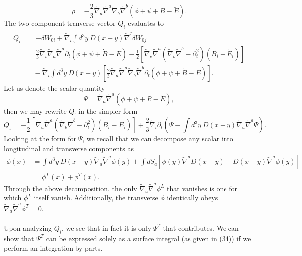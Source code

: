 \documentclass[10pt,letterpaper]{article}
\begin{document}
\begin{equation}
\rho =  -\frac{2}{3} \tilde{\nabla}_a\tilde{\nabla}^a\tilde{\nabla}_b\tilde{\nabla}^b (\phi + \psi +\dot{B}-\ddot{E}).
\end{equation}
The two component tranverse vector $Q_i$ evaluates to
\begin{align}
Q_i &= -\delta W_{0i} + \tilde\nabla_i \int d^3y\ D(x-y)\tilde\nabla^j \delta W_{0j}
\nonumber\\
&=  \frac{2}{3}\tilde{\nabla}_i\tilde{\nabla}_a\tilde{\nabla}^a\partial_t(\phi +\psi +\dot{B}-\ddot{E})
	-\frac{1}{2}\left[ \tilde{\nabla}_a\tilde{\nabla}^a\left(\tilde{\nabla}_b\tilde{\nabla}^b-\partial_t^2\right)(B_i - \dot{E}_i) \right]
\nonumber\\
&\quad-  \tilde\nabla_i \int d^3y\ D(x-y) \left[\frac{2}{3} \tilde{\nabla}_a\tilde{\nabla}^a\tilde{\nabla}_b\tilde{\nabla}^b \partial_t (\phi + \psi +\dot{B}-\ddot{E})\right].
\end{align}
Let us denote the scalar quantity
\begin{equation}
\Psi = \tilde{\nabla}_a\tilde{\nabla}^a (\phi +\psi +\dot{B}-\ddot{E}),
\end{equation}
then we may rewrite $Q_i$ in the simpler form
\begin{equation}
Q_i=-\frac{1}{2}\left[ \tilde{\nabla}_a\tilde{\nabla}^a\left(\tilde{\nabla}_b\tilde{\nabla}^b-\partial_t^2\right)(B_i - \dot{E}_i) \right]
+ \frac23\tilde\nabla_i \partial_t \left( \Psi -  \int d^3y\ D(x-y) \tilde\nabla_a\tilde\nabla^a \Psi\right).
\end{equation}
Looking at the form for $\Psi$, we recall that we can decompose any scalar into longitudinal and transverse components as
\begin{align}
\phi(x) &= \int d^3y\ D(x-y) \tilde\nabla_a\tilde\nabla^a \phi(y) + 
\int dS_a\left[ \phi(y)\tilde\nabla^a D(x-y) - D(x-y) \tilde\nabla^a \phi(y)\right]
\nonumber\\
&= \phi^L(x) + \phi^T(x).
\end{align}
Through the above decomposition, the only $\tilde\nabla_a\tilde\nabla^a \phi^L$ that vanishes is one for which $\phi^L$ itself vanish. Additionally, the transverse $\phi$ identically obeys $\tilde\nabla_a\tilde\nabla^a \phi^T = 0$. 
\\ \\
Upon analyzing $Q_i$, we see that in fact it is only $\Psi^T$ that contributes. We can show that $\Psi^T$ can be expressed solely as a surface integral (as given in (34)) if we perform an integration by parts. 
\end{document}
